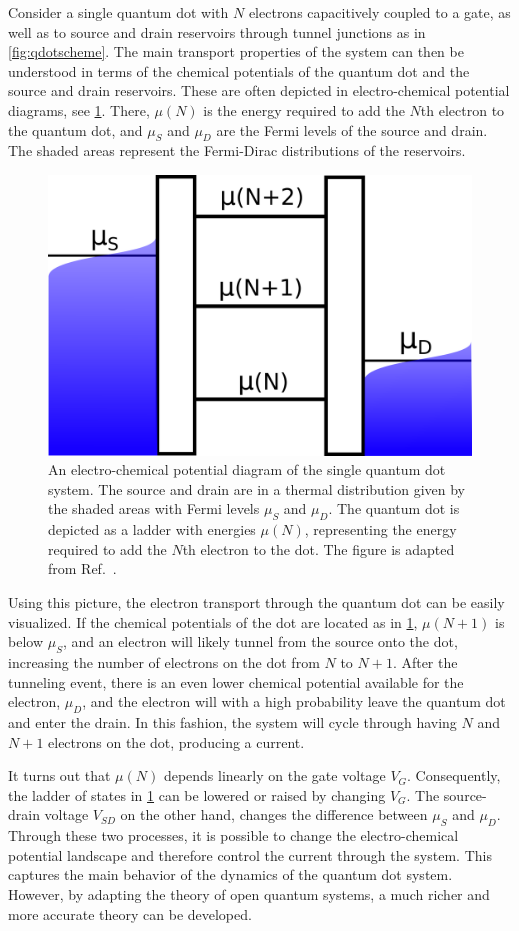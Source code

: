 \documentclass[../main.tex]{subfiles}
\begin{document}
Consider a single quantum dot with $N$ electrons capacitively coupled to a gate, as well as to source and drain reservoirs through tunnel junctions as in \cref{fig:qdotscheme}. The main transport properties of the system can then be understood in terms of the chemical potentials of the quantum dot and the source and drain reservoirs. These are often depicted in electro-chemical potential diagrams, see \cref{fig:ladder}. There, $\mu(N)$ is the energy required to add the $N$th electron to the quantum dot, and $\mu_S$ and $\mu_D$ are the Fermi levels of the source and drain. The shaded areas represent the Fermi-Dirac distributions of the reservoirs.
\begin{figure}[H]
    \centering
    \includegraphics[width=0.5\linewidth]{figures/ladder.png}
    \caption{An electro-chemical potential diagram of the single quantum dot system. The source and drain are in a thermal distribution given by the shaded areas with Fermi levels $\mu_S$ and $\mu_D$. The quantum dot is depicted as a ladder with energies $\mu(N)$, representing the energy required to add the $N$th electron to the dot. The figure is adapted from Ref.~\cite{transport}.}
    \label{fig:ladder}
\end{figure}
Using this picture, the electron transport through the quantum dot can be easily visualized. If the chemical potentials of the dot are located as in \cref{fig:ladder}, $\mu(N + 1)$ is below $\mu_S$, and an electron will likely tunnel from the source onto the dot, increasing the number of electrons on the dot from $N$ to $N+1$. After the tunneling event, there is an even lower chemical potential available for the electron, $\mu_D$, and the electron will with a high probability leave the quantum dot and enter the drain. In this fashion, the system will cycle through having $N$ and $N+1$ electrons on the dot, producing a current.  

It turns out that $\mu(N)$ depends linearly on the gate voltage $V_G$. Consequently, the ladder of states in \cref{fig:ladder} can be lowered or raised by changing $V_G$. The source-drain voltage $V_{SD}$ on the other hand, changes the difference between $\mu_S$ and $\mu_D$. Through these two processes, it is possible to change the electro-chemical potential landscape and therefore control the current through the system. This captures the main behavior of the dynamics of the quantum dot system. However, by adapting the theory of open quantum systems, a much richer and more accurate theory can be developed.
\end{document}
